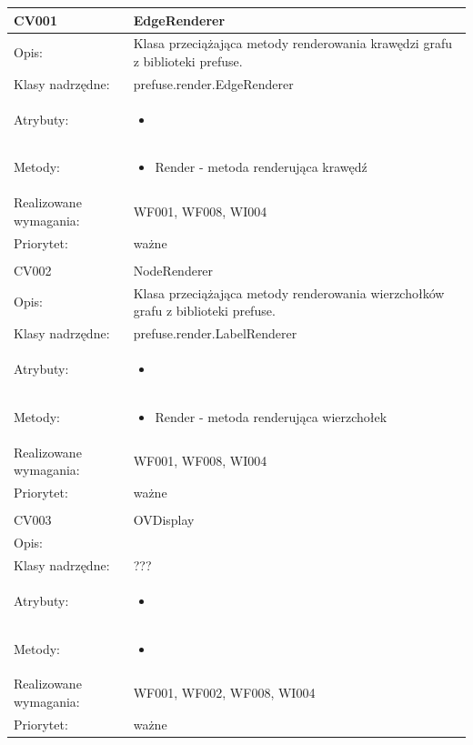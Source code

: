 \documentclass[a4paper,10pt]{article}
\begin{document}
\begin{center}
 

\begin{longtable}{|m{3cm}|m{9cm}|} \hline

CV001 & EdgeRenderer \\ \hline
Opis: & Klasa przeciążająca metody renderowania krawędzi grafu z biblioteki prefuse. \\ \hline
Klasy nadrzędne: &  prefuse.render.EdgeRenderer   \\ \hline
Atrybuty: & \begin{itemize}
 \item 
\end{itemize}
 \\ \hline
Metody: & \begin{itemize}
 \item Render - metoda renderująca krawędź
\end{itemize}
  \\ \hline
Realizowane wymagania: & WF001, WF008, WI004 \\ \hline
Priorytet: & ważne  \\ \hline

\multicolumn{2}{c}{} \\
 \hline

CV002 & NodeRenderer \\ \hline
Opis: & Klasa przeciążająca metody renderowania wierzchołków grafu z biblioteki prefuse.    \\ \hline
Klasy nadrzędne: &  prefuse.render.LabelRenderer   \\ \hline
Atrybuty: & \begin{itemize}
 \item 
\end{itemize}
 \\ \hline
Metody: & \begin{itemize}
 \item Render - metoda renderująca wierzchołek
\end{itemize}
  \\ \hline
Realizowane wymagania: & WF001, WF008, WI004 \\ \hline
Priorytet: & ważne  \\ \hline

\multicolumn{2}{c}{} \\
 \hline

CV003 & OVDisplay \\ \hline
Opis: &     \\ \hline
Klasy nadrzędne: &  ???   \\ \hline
Atrybuty: & \begin{itemize}
 \item 
\end{itemize}
 \\ \hline
Metody: & \begin{itemize}
 \item 
\end{itemize}
  \\ \hline
Realizowane wymagania: & WF001, WF002, WF008, WI004 \\ \hline
Priorytet: & ważne  \\ \hline


\end{longtable}
\end{center}
\end{document}
